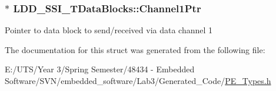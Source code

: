 \subsubsection[{Channel1\+Ptr}]{$\ast$ L\+D\+D\+\_\+\+S\+S\+I\+\_\+\+T\+Data\+Blocks\+::\+Channel1\+Ptr}\label{struct_l_d_d___s_s_i___t_data_blocks_a5c0e65fe82f88a245123217769316fef}
Pointer to data block to send/received via data channel 1 

The documentation for this struct was generated from the following file\+:\begin{DoxyCompactItemize}
\item 
E\+:/\+U\+T\+S/\+Year 3/\+Spring Semester/48434 -\/ Embedded Software/\+S\+V\+N/embedded\+\_\+software/\+Lab3/\+Generated\+\_\+\+Code/\hyperlink{_p_e___types_8h}{P\+E\+\_\+\+Types.\+h}\end{DoxyCompactItemize}
